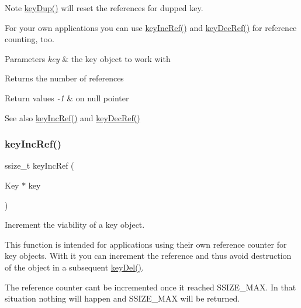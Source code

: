 \begin{DoxyNote}{Note}
\mbox{\hyperlink{group__key_gae6ec6a60cc4b8c1463fa08623d056ce3}{key\+Dup()}} will reset the references for dupped key.
\end{DoxyNote}
For your own applications you can use \mbox{\hyperlink{group__key_ga6970a6f254d67af7e39f8e469bb162f1}{key\+Inc\+Ref()}} and \mbox{\hyperlink{group__key_ga2c6433ca22109e4e141946057eccb283}{key\+Dec\+Ref()}} for reference counting, too.


\begin{DoxyParams}{Parameters}
{\em key} & the key object to work with \\
\hline
\end{DoxyParams}
\begin{DoxyReturn}{Returns}
the number of references 
\end{DoxyReturn}

\begin{DoxyRetVals}{Return values}
{\em -\/1} & on null pointer \\
\hline
\end{DoxyRetVals}
\begin{DoxySeeAlso}{See also}
\mbox{\hyperlink{group__key_ga6970a6f254d67af7e39f8e469bb162f1}{key\+Inc\+Ref()}} and \mbox{\hyperlink{group__key_ga2c6433ca22109e4e141946057eccb283}{key\+Dec\+Ref()}} 
\end{DoxySeeAlso}
\mbox{\label{group__key_ga6970a6f254d67af7e39f8e469bb162f1}} 
\subsubsection{\texorpdfstring{keyIncRef()}{keyIncRef()}}
{\footnotesize\ttfamily ssize\+\_\+t key\+Inc\+Ref (\begin{DoxyParamCaption}\item[{Key $\ast$}]{key }\end{DoxyParamCaption})}



Increment the viability of a key object. 

This function is intended for applications using their own reference counter for key objects. With it you can increment the reference and thus avoid destruction of the object in a subsequent \mbox{\hyperlink{group__key_ga3df95bbc2494e3e6703ece5639be5bb1}{key\+Del()}}.

The reference counter can\textquotesingle{}t be incremented once it reached S\+S\+I\+Z\+E\+\_\+\+M\+AX. In that situation nothing will happen and S\+S\+I\+Z\+E\+\_\+\+M\+AX will be returned.

